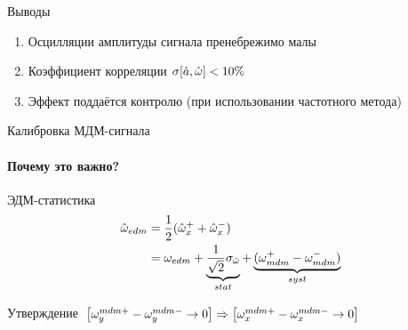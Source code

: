 \documentclass[14pt]{beamer}
\begin{document}
\begin{frame}\centering
{}
\end{frame}

\begin{frame}{Выводы}
\begin{enumerate}
\item Осцилляции амплитуды сигнала пренебрежимо малы
\item Коэффициент корреляции $\sigma[\hat a, \hat{\omega}] < 10\%$
\item Эффект поддаётся контролю (при использовании частотного метода)
\end{enumerate}
\end{frame}

\begin{frame}{Калибровка МДМ-сигнала}
\framesubtitle{Почему это важно?}
\begin{block}{ЭДМ-статистика}
	\begin{align*}
		\hat{\omega}_{edm} &= \frac12(\hat{\omega}_x^+ + \hat{\omega}_x^-) \\
		&= \omega_{edm} + \underbrace{\frac{1}{\sqrt2}\sigma_{\hat{\omega}}}_{stat} + \underbrace{(\omega_{mdm}^+ - \omega_{mdm}^-)}_{syst}
	\end{align*}
\end{block}
\begin{block}{Утверждение}
	$\left[\omega_y^{mdm+} - \omega_y^{mdm-} \to 0\right] \Rightarrow \left[\omega_x^{mdm+} - \omega_x^{mdm-} \to 0\right]$
\end{block}
\end{frame}
\end{document}
